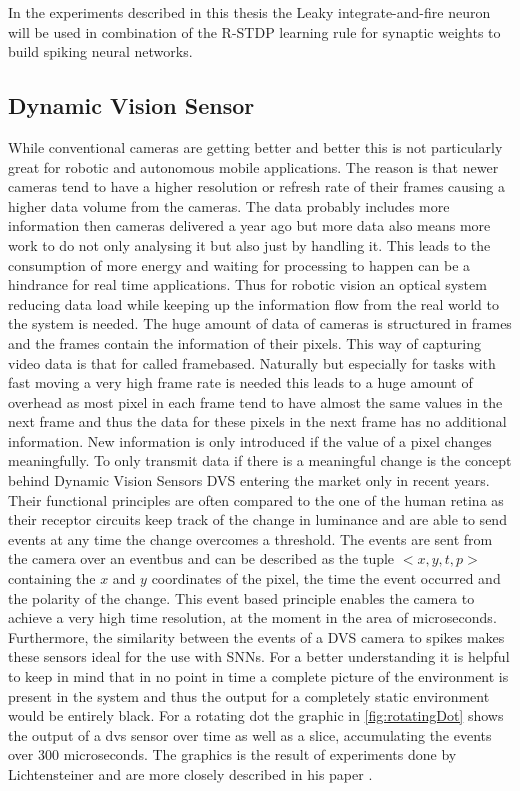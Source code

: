In the experiments described in this thesis the Leaky integrate-and-fire neuron will be used in combination of the R-STDP learning rule for synaptic weights to build spiking neural networks.

\subsection{Dynamic Vision Sensor}
While conventional cameras are getting better and better this is not particularly great for robotic and autonomous mobile applications. The reason is that newer cameras tend to have a higher resolution or refresh rate of their frames causing a higher data volume from the cameras. The data probably includes more information then cameras delivered a year ago but more data also means more work to do not only analysing it but also just by handling it. This leads to the consumption of more energy and waiting for processing to happen can be a hindrance for real time applications. Thus for robotic vision an optical system reducing data load while keeping up the information flow from the real world to the system is needed. The huge amount of data of cameras is structured in frames and the frames contain the information of their pixels. This way of capturing video data is that for called framebased. Naturally but especially for tasks with fast moving a very high frame rate is needed this leads to a huge amount of overhead as most pixel in each frame tend to have almost the same values in the next frame and thus the data for these pixels in the next frame has no additional information. New information is only introduced if the value of a pixel changes meaningfully.
To only transmit data if there is a meaningful change is the concept behind Dynamic Vision Sensors DVS entering the market only in recent years. Their functional principles are often compared to the one of the human retina as their receptor circuits keep track of the change in luminance and are able to send events at any time the change overcomes a threshold. The events are sent from the camera over an eventbus and can be described as the tuple $<x,y,t,p>$ containing the $x$ and $y$ coordinates of the pixel, the time the event occurred and the polarity of the change. This event based principle enables the camera to achieve a very high time resolution, at the moment in the area of microseconds. Furthermore, the similarity between the events of a DVS camera to spikes makes these sensors ideal for the use with SNNs.
For a better understanding it is helpful to keep in mind that in no point in time a complete picture of the environment is present in the system and thus the output for a completely static environment would be entirely black. For a rotating dot the graphic in \autoref{fig:rotatingDot} shows the output of a dvs sensor over time as well as a slice, accumulating the events over 300 microseconds. The graphics is the result of experiments done by Lichtensteiner and are more closely described in his paper \cite{lichtsteiner2008128}.

